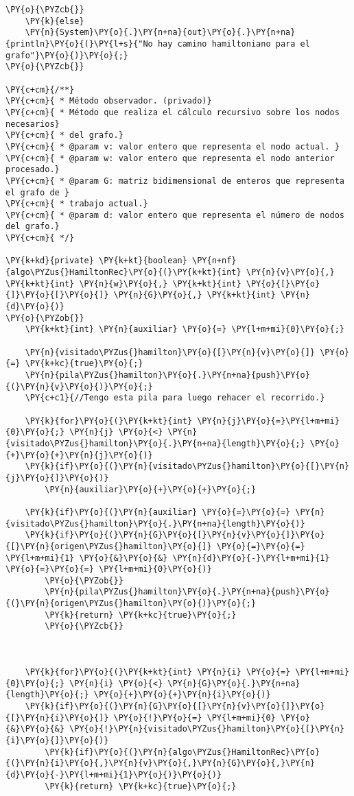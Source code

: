 \begin{Verbatim}[commandchars=\\\{\}]
	\PY{o}{\PYZcb{}}
    \PY{k}{else}
	\PY{n}{System}\PY{o}{.}\PY{n+na}{out}\PY{o}{.}\PY{n+na}{println}\PY{o}{(}\PY{l+s}{"No hay camino hamiltoniano para el grafo"}\PY{o}{)}\PY{o}{;}
\PY{o}{\PYZcb{}}

\PY{c+cm}{/**}
\PY{c+cm}{ * Método observador. (privado)}
\PY{c+cm}{ * Método que realiza el cálculo recursivo sobre los nodos necesarios}
\PY{c+cm}{ * del grafo.}
\PY{c+cm}{ * @param v: valor entero que representa el nodo actual. }
\PY{c+cm}{ * @param w: valor entero que representa el nodo anterior procesado.}
\PY{c+cm}{ * @param G: matriz bidimensional de enteros que representa el grafo de }
\PY{c+cm}{ * trabajo actual.}
\PY{c+cm}{ * @param d: valor entero que representa el número de nodos del grafo.}
\PY{c+cm}{ */}

\PY{k+kd}{private} \PY{k+kt}{boolean} \PY{n+nf}{algo\PYZus{}HamiltonRec}\PY{o}{(}\PY{k+kt}{int} \PY{n}{v}\PY{o}{,} \PY{k+kt}{int} \PY{n}{w}\PY{o}{,} \PY{k+kt}{int} \PY{o}{[}\PY{o}{]}\PY{o}{[}\PY{o}{]} \PY{n}{G}\PY{o}{,} \PY{k+kt}{int} \PY{n}{d}\PY{o}{)}
\PY{o}{\PYZob{}}
    \PY{k+kt}{int} \PY{n}{auxiliar} \PY{o}{=} \PY{l+m+mi}{0}\PY{o}{;}

    \PY{n}{visitado\PYZus{}hamilton}\PY{o}{[}\PY{n}{v}\PY{o}{]} \PY{o}{=} \PY{k+kc}{true}\PY{o}{;}
    \PY{n}{pila\PYZus{}hamilton}\PY{o}{.}\PY{n+na}{push}\PY{o}{(}\PY{n}{v}\PY{o}{)}\PY{o}{;} 
    \PY{c+c1}{//Tengo esta pila para luego rehacer el recorrido.}

    \PY{k}{for}\PY{o}{(}\PY{k+kt}{int} \PY{n}{j}\PY{o}{=}\PY{l+m+mi}{0}\PY{o}{;} \PY{n}{j} \PY{o}{<} \PY{n}{visitado\PYZus{}hamilton}\PY{o}{.}\PY{n+na}{length}\PY{o}{;} \PY{o}{+}\PY{o}{+}\PY{n}{j}\PY{o}{)}
	\PY{k}{if}\PY{o}{(}\PY{n}{visitado\PYZus{}hamilton}\PY{o}{[}\PY{n}{j}\PY{o}{]}\PY{o}{)}
	    \PY{n}{auxiliar}\PY{o}{+}\PY{o}{+}\PY{o}{;}

    \PY{k}{if}\PY{o}{(}\PY{n}{auxiliar} \PY{o}{=}\PY{o}{=} \PY{n}{visitado\PYZus{}hamilton}\PY{o}{.}\PY{n+na}{length}\PY{o}{)}
	\PY{k}{if}\PY{o}{(}\PY{n}{G}\PY{o}{[}\PY{n}{v}\PY{o}{]}\PY{o}{[}\PY{n}{origen\PYZus{}hamilton}\PY{o}{]} \PY{o}{=}\PY{o}{=} \PY{l+m+mi}{1} \PY{o}{&}\PY{o}{&} \PY{n}{d}\PY{o}{-}\PY{l+m+mi}{1} \PY{o}{=}\PY{o}{=} \PY{l+m+mi}{0}\PY{o}{)}
	    \PY{o}{\PYZob{}}
		\PY{n}{pila\PYZus{}hamilton}\PY{o}{.}\PY{n+na}{push}\PY{o}{(}\PY{n}{origen\PYZus{}hamilton}\PY{o}{)}\PY{o}{;}
		\PY{k}{return} \PY{k+kc}{true}\PY{o}{;}
	    \PY{o}{\PYZcb{}}



    \PY{k}{for}\PY{o}{(}\PY{k+kt}{int} \PY{n}{i} \PY{o}{=} \PY{l+m+mi}{0}\PY{o}{;} \PY{n}{i} \PY{o}{<} \PY{n}{G}\PY{o}{.}\PY{n+na}{length}\PY{o}{;} \PY{o}{+}\PY{o}{+}\PY{n}{i}\PY{o}{)}
	\PY{k}{if}\PY{o}{(}\PY{n}{G}\PY{o}{[}\PY{n}{v}\PY{o}{]}\PY{o}{[}\PY{n}{i}\PY{o}{]} \PY{o}{!}\PY{o}{=} \PY{l+m+mi}{0} \PY{o}{&}\PY{o}{&} \PY{o}{!}\PY{n}{visitado\PYZus{}hamilton}\PY{o}{[}\PY{n}{i}\PY{o}{]}\PY{o}{)}
	    \PY{k}{if}\PY{o}{(}\PY{n}{algo\PYZus{}HamiltonRec}\PY{o}{(}\PY{n}{i}\PY{o}{,}\PY{n}{v}\PY{o}{,}\PY{n}{G}\PY{o}{,}\PY{n}{d}\PY{o}{-}\PY{l+m+mi}{1}\PY{o}{)}\PY{o}{)}
		\PY{k}{return} \PY{k+kc}{true}\PY{o}{;}


\end{Verbatim}
